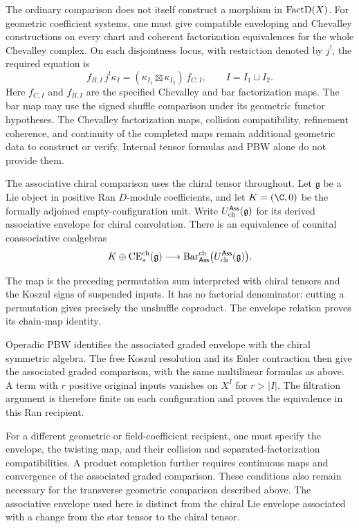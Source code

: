The ordinary comparison does not itself construct a morphism in $\operatorname{FactD}(X)$.
For geometric coefficient systems, one must give compatible enveloping and Chevalley constructions on every chart
and coherent factorization equivalences for the whole Chevalley complex.
On each disjointness locus, with restriction denoted by $j^!$, the required equation is
\[
 f_{B,I}\,j^!\kappa_I
 =(\kappa_{I_1}\boxtimes\kappa_{I_2})\,f_{C,I},
 \qquad I=I_1\sqcup I_2.
\]
Here $f_{C,I}$ and $f_{B,I}$ are the specified Chevalley and bar factorization maps.
The bar map may use the signed shuffle comparison under its geometric functor hypotheses.
The Chevalley factorization maps, collision compatibility, refinement coherence,
and continuity of the completed maps remain additional geometric data to construct or verify.
Internal tensor formulas and PBW alone do not provide them.


The associative chiral comparison uses the chiral tensor throughout.
Let $\mathfrak g$ be a Lie object in positive Ran $D$-module coefficients,
and let $K=(\C,0)$ be the formally adjoined empty-configuration unit.
Write $U_{\mathrm{ch}}^{\mathsf{Ass}}(\mathfrak g)$ for its derived associative envelope
for chiral convolution. There is an equivalence of counital coassociative coalgebras
\[
 K\oplus\operatorname{CE}_*^{\mathrm{ch}}(\mathfrak g)\longrightarrow
 \operatorname{Bar}^{\mathrm{ch}}_{\mathsf{Ass}}\bigl(U_{\mathrm{ch}}^{\mathsf{Ass}}(\mathfrak g)\bigr).
\]

The map is the preceding permutation sum interpreted with chiral tensors
and the Koszul signs of suspended inputs. It has no factorial denominator:
cutting a permutation gives precisely the unshuffle coproduct.
The envelope relation proves its chain-map identity.

Operadic PBW identifies the associated graded envelope with the chiral
symmetric algebra. The free Koszul resolution and its Euler contraction
then give the associated graded comparison, with the same multilinear
formulas as above. A term with $r$ positive original inputs vanishes on
$X^I$ for $r>|I|$. The filtration argument is therefore finite on each
configuration and proves the equivalence in this Ran recipient.

For a different geometric or field-coefficient recipient, one must specify
the envelope, the twisting map, and their collision and separated-factorization
compatibilities. A product completion further requires continuous maps and
convergence of the associated graded comparison. These conditions also remain
necessary for the transverse geometric comparison described above.
The associative envelope used here is distinct from the chiral Lie envelope
associated with a change from the star tensor to the chiral tensor.

